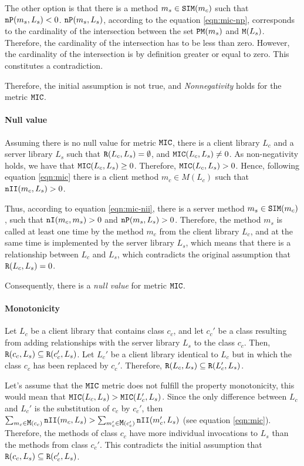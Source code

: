 The other option is that there is a method $m_s \in \verb|SIM|(m_c)$ such that $\verb|nP|(m_s, L_s) < 0$. $\verb|nP|(m_s, L_s)$, according to the equation \ref{eqn:mic-np}, corresponds to the cardinality of the intersection between the set $\verb|PM|(m_s)$ and $\verb|M|(L_s)$. Therefore, the cardinality of the intersection has to be less than zero. However, the cardinality of the intersection is by definition greater or equal to zero. This constitutes a contradiction.

Therefore, the initial assumption is not true, and \textit{Nonnegativity} holds for the metric $\verb|MIC|$.

\paragraph{Null value}
Assuming there is no null value for metric $\verb|MIC|$, there is a client library $L_c$ and a server library $L_s$ such that $\verb|R|(L_c, L_s) = \emptyset$, and $\verb|MIC|(L_c, L_s)	\neq 0$. As non-negativity holds, we have that $\verb|MIC|(L_c, L_s) \ge 0$. Therefore, $\verb|MIC|(L_c, L_s) > 0$. Hence, following equation \ref{eqn:mic} there is a client method $m_c \in M(L_c)$ such that $\verb|nII|(m_c, L_s) > 0$.

Thus, according to equation \ref{eqn:mic-nii}, there is a server method $m_s \in \verb|SIM|(m_c)$, such that $\verb|nI|(m_c, m_s) > 0$ and $\verb|nP|(m_s, L_s) > 0$. Therefore, the method $m_s$ is called at least one time by the method $m_c$ from the client library $L_c$, and at the same time is implemented by the server library $L_s$, which means that there is a relationship between $L_c$ and $L_s$, which contradicts the original assumption that $\verb|R|(L_c, L_s) = 0$.

Consequently, there is a \textit{null value} for metric $\verb|MIC|$.

\paragraph{Monotonicity}
Let $L_c$ be a client library that contains class $c_c$, and let $c_c'$ be a class resulting from adding relationships with the server library $L_s$ to the class $c_c$. Then, $\verb|R|(c_c, L_s) \subseteq \verb|R|(c_c', L_s)$. Let $L_c'$ be a client library identical to $L_c$ but in which the class $c_c$ has been replaced by $c_c'$. Therefore, $\verb|R|(L_c, L_s) \subseteq \verb|R|(L_c', L_s)$.

Let's assume that the $\verb|MIC|$ metric does not fulfill the property monotonicity, this would mean that $\verb|MIC|(L_c, L_s) > \verb|MIC|(L_c', L_s)$. Since the only difference between $L_c$ and $L_c'$ is the substitution of $c_c$ by $c_c'$, then $\sum_{m_c \in \verb|M|(c_c)} \verb|nII|(m_c, L_s) > \sum_{m_c' \in \verb|M|(c_c')} \verb|nII|(m_c', L_s)$ (see equation \ref{eqn:mic}). Therefore, the methods of class $c_c$ have more individual invocations to $L_s$ than the methods from class $c_c'$. This contradicts the initial assumption that $\verb|R|(c_c, L_s) \subseteq \verb|R|(c_c', L_s)$.

